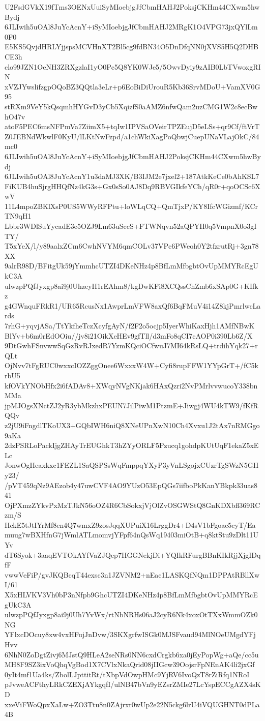U2FsdGVkX19fTms3OENxUuiSyMIoebjgJfCbmHAHJ2PoksjCKHm44CXwm5hwBydj
6JLIwih5uOAl8JuYcAcnY+iSyMIoebjgJfCbmHAHJ2MRgK1O4VPG73jxQYlLm0F0
E5KS5QvjdHRLYjjspsMCVHnXT2Bl5cg9fdBN34O5DnDfqNN0jXVS5H5Q2DHBCE3h
clo99JZN1OeNH3ZRXgzlaI1yO0Pc5Q8YK0WJe5/5OwvDyiy9zAIB0LbTVwoxgRIN
xVZJYwslifzgpOQoBZ3QQtla3eLr+p6EoBiDiUrouR5Kb36SrvMDoU+VamXV0G95
stRXm9VeY5kQsqmhHYGvD3yCb5XqizfS0aAMZ6nfwQam2uzCMG1W2c8ecBwhO47v
atoF5PEC6msNFPmVa7ZiimX5+tqIw1IPVSaOVeirTPZEujD5eLSs+qr9Cf/ftVrT
Z0JEBNdWkwlF0KyU/lLKtNwFzpd/a1chWkiXagPoQbwjCuepUNaVLajOkC/84mc0
6JLIwih5uOAl8JuYcAcnY+iSyMIoebjgJfCbmHAHJ2PoksjCKHm44CXwm5hwBydj
6JLIwih5uOAl8JuYcAcnY1u3daMJ3XK/B3IJM2e7jxel2+187AtkKeCe0bAhKSL7
FiKUB4huSjrgHHQfNz4kG3s+Gx0sSo0AJ8Dq9RBVGIkfeYCh/qR0r+qoOCSc6XwV
11L4mpoZBKlXsP0US5WWyRFPtu+loWLqCQ+QmTjxP/KY8IfcWGizmf/KCrTN9qH1
Lbbr3WDlSuYycadE3e5OZJ9Lm63uSccS+FTWNqvn52aQPYII0q5VmpnX0o3gITY/
T5xYeX/l/y89aalxZCm6CwhNVYM6qmCOLv37VPc6PWeoh0Y2tfzrutRj+3gn78XX
9alrR98D/BFitgUk59jYmmhcUTZI4DKeNHz4p8BfLmMfbgbtOvUpMMYRcEgUkC3A
ulwzpPQfJyxgp8ai9j0UhzeyH1rEAhm8/kgDwKFi8XCQssChZmb6xSAp0G+KIfkz
g4GWnquFRkR1/UR65RcusNx1AwprLmVFW8axQf6BqFMuV4i14Z8kjPmrlwcLards
7rhG+yqvjASa/TtYkfheTczXcyfgAyN/f2F2o5ocjp5IyerWhiKaxHjh1AMfNBwK
BlYv+b6m0rEdOOiu//jv8i21OikXeHEv9gfTll/d3mFo8qCI7cAOP0i390Lb6Z/X
9DtGwhFSnvwwSqGzRvRJxedR7YzmKQciOCfwuJ7MI64kRsLQ+trdihYqk27+rQLt
OjNvv7tFgRUC0wxxcIOZZggOnee6WxxxW4W+Cyfi8rupFFW1YYpGrT+/fC5krbU5
kfOVkYNObHfx2i6fADAv8+XWqyNVgNKjak6HAxQzri2NvPMrlvvwucoY338bnMMa
jpMJOgsXNctZJ2yR3ybMkzhxPEUN7JilPiwM1PtzmE+Jiwgj4WU4kTW9/fKfRQQv
z2jU9iFngdlTKoUX3+GQbIWH6niQ8XNeUPnXwN10Ch4Xvxu1J2tAx7nRMGgo9aKa
2dzPSRLoPackIjgZHAyTrEUGhkT3hZYyORLF5Pzucq1gohdpKUtUqF1ekaZ5xELc
JonwOgHeaxkxc1FEZL1SaQSPSsWqFmppqYXyP3yVnLSgojxCUzrTgSWzN5GHy23/
/pVT459qNz9AEzob4y47uwCVF4AO9YUzO53EpQGs7iifboPkKanYBkpk33uas841
OjPXmzZYkvPxMzTJkN56oOZ4R6CbSokxjVjOlZvOSGWStQ8GnKDXbfl369RCzm/S
HckE5tJtIYrMf8en4Q7wmxZ9zosJqqXUPuiX16LrggDr4+D4sV1bFgoac5cyT/Ea
muug7wBXHfnG7jWmlATLmomvjYFpf64nQsWq19403miOtB+q8ktStu9zDlt11UYv
dT6Syok+3aaqEVTOkAYfVaZJQep7HGGNekjDi+YQIkRFurgBBnKIkRjjXjgIDqfF
vwwVeFiP/gvJKQBcqT44exsc3n1JZVNM2+nEac1LASKQfNQm1DPPAtRBllXwI/61
X5xHLVKV3Vh0bP3nNfpb9GhcUTZI4DKeNHz4p8BfLmMfbgbtOvUpMMYRcEgUkC3A
ulwzpPQfJyxgp8ai9j0Uh7YvWx/rtNbNRHs06aJ2cyR6Nk4xoxOtTXxWmmOZk0NG
YFlxcDOcuy8xw4vxHFujJnDvw/3SKXgrfwISGk0MJSFvaud94MlNOeUMgdYFjHvv
6NhN0ZoDgtZivj6MJstQ9HLeA2seNRs0NN6cxdCrgkb6xa0jEyPopWg+aQe/cc5u
MH8F9SZ3ixVoQhqVgBod1X7CVlxNkaQrid08jIIGcw39OojsrFpNEnAK4li2jxGf
0yIt4mf1Ua4ks/ZbolLJpttitRt/tXbpVdOwpHMc9YjRV6IvoQzT8rZiRfq1NRoI
pJvweACFthyLRkCZEXjAYkgqfI/ulNB47bVn9yEZsrZMIe27LcYspECCgAZX4sKD
xxeViFWoQpxXaLw+ZO3Ttu8n0ZAjrxr0wUp2e22N5ckg6lrU4iVQUGHNT0dPLa4B
